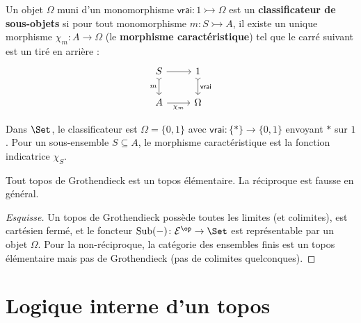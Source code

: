 \begin{definition}\label{def:classificateur}
Un objet $\Omega$ muni d'un monomorphisme
$\mathsf{vrai} \colon 1 \rightarrowtail \Omega$
est un \textbf{classificateur de sous-objets} si pour tout
monomorphisme $m \colon S \rightarrowtail A$, il existe un unique
morphisme $\chi_m \colon A \to \Omega$ (le \textbf{morphisme
caractéristique}) tel que le carré suivant est un tiré en arrière :
\[
\begin{tikzcd}
S \arrow[r] \arrow[d, tail, "m"'] & 1 \arrow[d, tail, "\mathsf{vrai}"] \\
A \arrow[r, "\chi_m"'] & \Omega
\end{tikzcd}
\]
\end{definition}

\begin{exemple}\label{ex:omega-set}
Dans $\Set$, le classificateur est $\Omega = \{0, 1\}$ avec
$\mathsf{vrai} \colon \{*\} \to \{0,1\}$ envoyant $*$ sur $1$.
Pour un sous-ensemble $S \subseteq A$, le morphisme caractéristique
est la fonction indicatrice $\chi_S$.
\end{exemple}

\begin{proposition}\label{prop:topos-groth-elementaire}
Tout topos de Grothendieck est un topos élémentaire.  La réciproque
est fausse en général.
\end{proposition}

\begin{proof}[Esquisse]
Un topos de Grothendieck possède toutes les limites (et colimites),
est cartésien fermé, et le foncteur $\mathrm{Sub}(-) \colon
\mathcal{E}^\op \to \Set$ est représentable par un objet $\Omega$.
Pour la non-réciproque, la catégorie des ensembles finis est un
topos élémentaire mais pas de Grothendieck (pas de colimites
quelconques).
\end{proof}

\section{Logique interne d'un topos}\label{sec:logique-interne}

